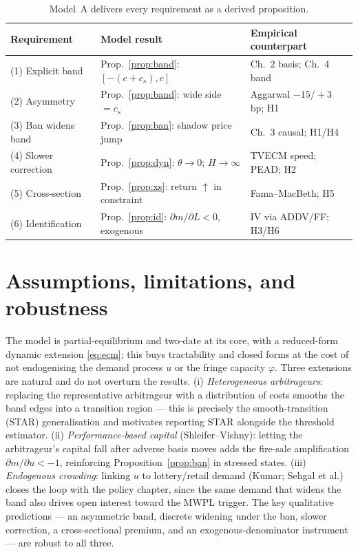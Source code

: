 \documentclass[11pt,a4paper]{article}
\theoremstyle{plain}
\theoremstyle{definition}
\theoremstyle{remark}
\begin{document}
\begin{table}[h]\centering\small\renewcommand{\arraystretch}{1.25}
\begin{tabular}{@{}p{} p{} p{}@{}}
\toprule
\textbf{Requirement} & \textbf{Model result} & \textbf{Empirical counterpart} \\
\midrule
(1) Explicit band & Prop.~\ref{prop:band}: $[-(c+c_s),c]$ & Ch.~2 basis; Ch.~4 band \\
(2) Asymmetry & Prop.~\ref{prop:band}: wide side $=c_s$ & Aggarwal $-15/+3$ bp; H1 \\
(3) Ban widens band & Prop.~\ref{prop:ban}: shadow price jump & Ch.~3 causal; H1/H4 \\
(4) Slower correction & Prop.~\ref{prop:dyn}: $\theta\!\to\!0$; $H\!\to\!\infty$ & TVECM speed; PEAD; H2 \\
(5) Cross-section & Prop.~\ref{prop:xs}: return $\uparrow$ in constraint & Fama--MacBeth; H5 \\
(6) Identification & Prop.~\ref{prop:id}: $\partial m/\partial L<0$, exogenous & IV via ADDV/FF; H3/H6 \\
\bottomrule
\end{tabular}
\caption{Model~A delivers every requirement as a derived proposition.}
\label{tab:mapA}
\end{table}

\section{Assumptions, limitations, and robustness}
The model is partial-equilibrium and two-date at its core, with a reduced-form dynamic extension \eqref{eq:ecm}; this buys tractability and closed forms at the cost of not endogenising the demand process $u$ or the fringe capacity $\varphi$. Three extensions are natural and do not overturn the results. (i) \emph{Heterogeneous arbitrageurs}: replacing the representative arbitrageur with a distribution of costs smooths the band edges into a transition region --- this is precisely the smooth-transition (STAR) generalisation and motivates reporting STAR alongside the threshold estimator. (ii) \emph{Performance-based capital} (Shleifer--Vishny): letting the arbitrageur's capital fall after adverse basis moves adds the fire-sale amplification $\partial m/\partial u<-1$, reinforcing Proposition~\ref{prop:ban} in stressed states. (iii) \emph{Endogenous crowding}: linking $u$ to lottery/retail demand (Kumar; Sehgal et al.) closes the loop with the policy chapter, since the same demand that widens the band also drives open interest toward the MWPL trigger. The key qualitative predictions --- an asymmetric band, discrete widening under the ban, slower correction, a cross-sectional premium, and an exogenous-denominator instrument --- are robust to all three.
\end{document}
